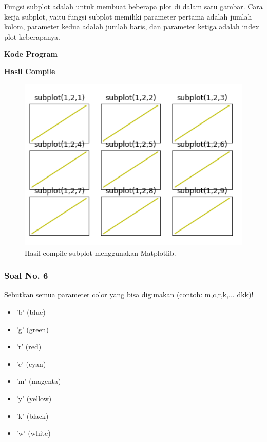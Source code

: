 \hfill \break
Fungsi subplot adalah untuk membuat beberapa plot di dalam satu gambar.
\hfill \break
Cara kerja subplot, yaitu fungsi subplot memiliki parameter pertama adalah jumlah kolom, parameter kedua adalah jumlah baris, dan parameter ketiga adalah index plot keberapanya.

\hfill \break
\textbf{Kode Program}



\hfill \break
\textbf{Hasil Compile}

\begin{figure}[H]
	\includegraphics[width=12cm]{figures/6/1174086/subplot.png}
	\centering
	\caption{Hasil compile subplot menggunakan Matplotlib.}
\end{figure}

\subsubsection{Soal No. 6}
\hfill \break
Sebutkan semua parameter color yang bisa digunakan (contoh:  m,c,r,k,...  dkk)!

\begin{itemize}
	\item 'b' (blue)
	\item 'g' (green)
	\item 'r' (red)
	\item 'c' (cyan)
	\item 'm' (magenta)
	\item 'y' (yellow)
	\item 'k' (black)
	\item 'w' (white)
\end{itemize}

